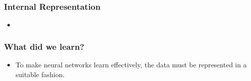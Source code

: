 \documentclass[8pt]{beamer}
\begin{document}
\begin{frame}
\frametitle{Internal Representation}
 \begin{itemize}
  \item 
 \end{itemize}
\end{frame}

\begin{frame}
\frametitle{What did we learn?}
 \begin{itemize}
  \item To make neural networks learn effectively, the data must be represented in a suitable fashion.
 \end{itemize}
\end{frame}
\end{document}

